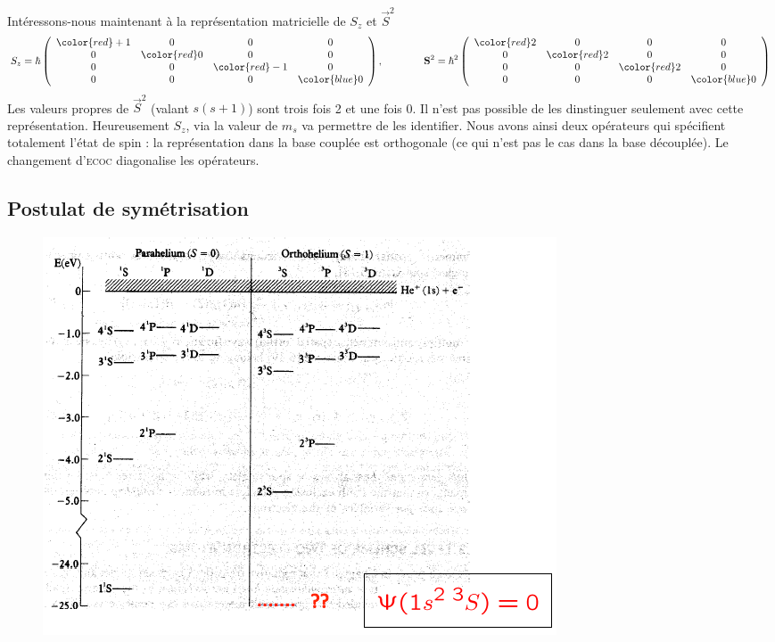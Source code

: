 Intéressons-nous maintenant à la représentation matricielle de $S_z$ et $\vec{S}^2$
\begin{equation}
S_z = \hbar  \left( \begin{array}{cccc}
{\color{red} +1 } &  0  &  0  &  0  \\
0    &  {\color{red} 0 }   &  0  &  0  \\
0    &  0  &  {\color{red} -1 }   &  0  \\
0    &  0  &  0  & {\color{blue} 0 }  \end{array} \right),\qquad\qquad
{\bf S}^2 = \hbar^2  \left( \begin{array}{cccc}
{\color{red} 2 } &  0  &  0  &  0  \\
0    &  {\color{red} 2 }  & 0 &  0  \\
0    &  0  & {\color{red} 2 } &  0  \\
0    &  0  &  0  & {\color{blue} 0 } \end{array} \right)
\end{equation}
Les valeurs propres de $\vec S^2$ (valant $s(s+1)$) sont trois fois 2 et une fois 0. Il n'est pas
possible de les dinstinguer seulement avec cette représentation. Heureusement $S_z$, via la valeur
de $m_s$ va permettre de les identifier. Nous avons ainsi deux opérateurs qui spécifient totalement
l'état de spin : la représentation dans la base couplée est orthogonale (ce qui n'est pas le cas dans
la base découplée). Le changement d'\textsc{ecoc} diagonalise les opérateurs.


\subsection{Postulat de symétrisation}

	\begin{figure}
	\vspace{-7mm}
	\includegraphics[scale=0.5]{ch3/image3}
	\end{figure}

